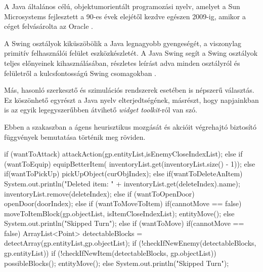 


A Java általános célú, objektumorientált programozási nyelv, amelyet a Sun Microsystems fejlesztett a 90-es évek elejétől kezdve egészen 2009-ig, amikor a céget felvásárolta az Oracle \cite{arnold2005java}.


A Swing osztályok kiküszöbölik a Java legnagyobb gyengeségét, a viszonylag primitív felhasználói felület eszközkészletét. A Java Swing segít a Swing osztályok teljes előnyeinek kihasználásában,
részletes leírást adva minden osztályról és felületről a kulcsfontosságú Swing csomagokban \cite{10.5555/291162}.

Más, hasonló szerkesztő és szimulációs rendszerek esetében is népszerű választás. Ez köszönhető egyrészt a Java nyelv elterjedtségének, másrészt, hogy napjainkban is az egyik legegyszerűbben átvihető \textit{widget toolkit}-ról van szó.


Ebben a szakaszban a ágens heurisztikus mozgását és akcióit végrehajtó biztosító függvények bemutatása történik meg röviden.

\begin{java}
if (wantToAttack) {
    attackAction(gp.entityList,isEnemyCloseIndexList);
} else if (wantToEquip) {			
    equipBetterItem(
        inventoryList.get(inventoryList.size() - 1));
} else if(wantToPickUp) {
    pickUpObject(curObjIndex);
} else if(wantToDeleteAnItem) {
    System.out.println("Deleted item: "
        + inventoryList.get(deleteIndex).name);
    inventoryList.remove(deleteIndex);
} else if (wantToOpenDoor) {
    openDoor(doorIndex);
} else if (wantToMoveToItem) {
    if(cannotMove == false) {
        moveToItemBlock(gp.objectList,
        isItemCloseIndexList);
        entityMove();
    } else System.out.println("Skipped Turn");
} else if (wantToMove) {
    if(cannotMove == false) {
        ArrayList<Point> detectableBlocks =
             detectArray(gp.entityList,gp.objectList);
        if (!checkIfNewEnemy(detectableBlocks,
        gp.entityList)) {
            if (!checkIfNewItem(detectableBlocks,
            gp.objectList)) {
                possibleBlocks();
            }
        }
        entityMove();
    } else System.out.println("Skipped Turn");
}
\end{java}

